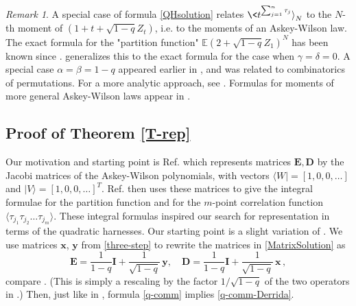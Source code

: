 \documentclass{amsart}
\theoremstyle{definition}
\theoremstyle{remark}
\newtheorem{remark}[theorem]{Remark}
\theoremstyle{remark}
\theoremstyle{definition}
\numberwithin{equation}{section}
\begin{document}
\begin{remark}
A special case of formula \eqref{QHsolution} relates $\<t^{\sum_{j=1}^n\tau_j}{\rangle}_N$ to the $N$-th moment of  $(1+t+\sqrt{1-q}Z_t)$, i.e. to the moments of an Askey-Wilson law.
The exact formula for the "partition function" ${\mathds{E}}(2+\sqrt{1-q}Z_1)^N$ has been known since \cite[Equation (57)]{blythe2000exact}.
    \citet[Theorem 1.3.1]{josuat2011combinatorics} generalizes this to the exact formula for the case when $\gamma=\delta=0$.
   A special case   $\alpha=\beta=1-q$ appeared earlier in \cite{josuat2011rook},
  and was related to combinatorics of permutations. For a more analytic approach, see  \cite{szablowski2015moments}.
Formulas for moments of  more general Askey-Wilson laws appear in
\cite{corteel2012formulae,kim2014moments}.

\end{remark}

\subsection{Proof of Theorem \ref{T-rep}}\label{Sect:PTR} {}
Our motivation and starting point is Ref. \cite{uchiyama2004asymmetric} which represents matrices ${\mathbf{E}},{\mathbf{D}}$
by the Jacobi matrices of the Askey-Wilson polynomials, with vectors $\langle W|=[1,0,0,\dots]$ and $|V\rangle=[1,0,0,\dots]^T$.
Ref. \cite{uchiyama2004asymmetric} then uses these matrices to give  the integral formulae for the partition function and for the $m$-point correlation function
$\langle \tau_{j_1}\tau_{j_2}\dots\tau_{j_m}\rangle$.
These integral formulas inspired our search for representation in terms of the quadratic harnesses.
Our starting point is a slight variation of \cite[formula (4.5)]{uchiyama2004asymmetric}. We use matrices ${\mathbf{x}}$, ${\mathbf{y}}$ from \eqref{three-step}   to rewrite the matrices in \eqref{MatrixSolution} as
\begin{equation}
  \label{J2C}
{\mathbf{E}}= \frac{1}{1-q}{\mathbf{I}}+\frac{1}{\sqrt{1-q}}\,{\mathbf{y}}, \quad {\mathbf{D}}=\frac{1}{1-q}{\mathbf{I}}+\frac{1}{\sqrt{1-q}}\,{\mathbf{x}}\,,
\end{equation}
compare \cite[formulas (13) and (14)]{blythe2000exact}. (This is simply a rescaling by the factor $1/\sqrt{1-q}$ of the two
operators in \cite[formula (4.5)]{uchiyama2004asymmetric}.) {} Then, just like in
\cite{uchiyama2004asymmetric}, formula \eqref{q-comm} implies \eqref{q-comm-Derrida}.
\end{document}
